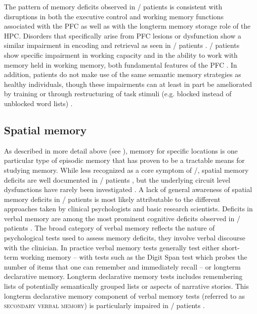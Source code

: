The pattern of memory deficits observed in \scz/ patients is consistent with disruptions in both the executive control and working memory functions associated with the \ac{PFC} as well as with the longterm memory storage role of the \ac{HPC}.
Disorders that specifically arise from \ac{PFC} lesions or dysfunction show a similar impairment in encoding and retrieval as seen in \scz/ patients \citep{Ranganath2008}.
\Scz/ patients show specific impairment in working capacity and in the ability to work with memory held in working memory, both fundamental features of the \ac{PFC} \citep{Gold2010, Cannon2005}.
In addition, patients do not make use of the same semantic memory strategies as healthy individuals, though these impairments can at least in part be ameliorated by training or through restructuring of task stimuli (e.g. blocked instead of unblocked word lists) \citep{Gold1992, Stone1998}.

\subsection{Spatial memory}
\label{sec:intro:scz:spatial}
As described in more detail above (see ), memory for specific locations is one particular type of episodic memory that has proven to be a tractable means for studying memory.
While less recognized as a core symptom of \scz/, spatial memory deficits are well documented in \scz/ patients \citep{Boyer2007, Hanlon2006, Wilkins2013, Weniger2008}, but the underlying circuit level dysfunctions have rarely been investigated \citep{Hayashi2015, Suh2013}.
A lack of general awareness of spatial memory deficits in \scz/ patients is most likely attributable to the different approaches taken by clinical psychologists and basic research scientists.
Deficits in verbal memory are among the most prominent cognitive deficits observed in \scz/ patients \citep{O'Carroll2000}.
The broad category of verbal memory reflects the nature of psychological tests used to assess memory deficits, they involve verbal discourse with the clinician.
In practice verbal memory tests generally test either short-term working memory -- with tests such as the Digit Span test which probes the number of items that one can remember and immediately recall -- or longterm declarative memory.
Longterm declarative memory tests includes remembering lists of potentially semantically grouped lists or aspects of narrative stories.
This longterm declarative memory component of verbal memory tests (referred to as \textsc{secondary verbal memory}) is particularly impaired in \scz/ patients \citep{Green1996}.

